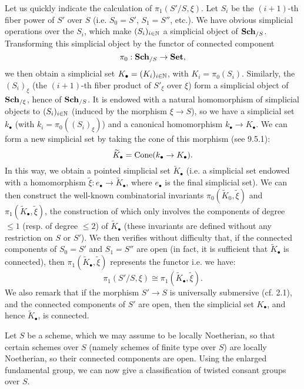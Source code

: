 Let us quickly indicate the calculation of $\pi_1(S'/S,\xi)$. Let $S_i$ be the $(i+1)$-th fiber power of $S'$ over $S$ (i.e. $S_0=S'$, $S_1=S''$, etc.). We have obvious simplicial operations over the $S_i$, which make $(S_i)_{i\in\mathbb{N}}$ a simplicial object of $\mathbf{Sch}_{/S}$. Transforming this simplicial object by the functor of connected component
\[\pi_0:\mathbf{Sch}_{/S}\to\mathbf{Set},\]
we then obtain a simplicial set $K_\bullet=(K_i)_{i\in\mathbb{N}}$, with $K_i=\pi_0(S_i)$. Similarly, the $(S_i)_\xi$ (the $(i+1)$-th fiber product of $S'_\xi$ over $\xi$) form a simplicial object of $\mathbf{Sch}_{/\xi}$, hence of $\mathbf{Sch}_{/S}$. It is endowed with a natural homomorphism of simplicial objects to $(S_i)_{i\in\mathbb{N}}$ (induced by the morphism $\xi\to S$), so we have a simplicial set $k_\bullet$ (with $k_i=\pi_0((S_i)_\xi)$) and a canonical homomorphism $k_\bullet\to K_\bullet$. We can form a new simplicial set by taking the cone of this morphism (see \cite{SGA3-2}  9.5.1):
\[\widetilde{K}_\bullet=\mathrm{Cone}(k_\bullet\to K_\bullet).\]
In this way, we obtain a pointed simplicial set $\widetilde{K}_\bullet$ (i.e. a simplicial set endowed with a homomorphism $\tilde{\xi}:e_\bullet\to\widetilde{K}_\bullet$, where $e_\bullet$ is the final simplicial set). We can then construct the well-known combinatorial invariants $\pi_0(\widetilde{K}_0,\tilde{\xi})$ and $\pi_1(\widetilde{K}_\bullet,\tilde{\xi})$, the construction of which only involves the components of degree $\leq 1$ (resp. of degree $\leq 2$) of $\widetilde{K}_\bullet$ (these invariants are defined without any restriction on $S$ or $S'$). We then verifies without difficulty that, if the connected components of $S_0=S'$ and $S_1=S''$ are open (in fact, it is sufficient that $\widetilde{K}_\bullet$ is connected), then $\pi_1(\widetilde{K}_\bullet,\tilde{\xi})$ represents the functor i.e. we have:
\[\pi_1(S'/S,\xi)\cong\pi_1(\widetilde{K}_\bullet,\tilde{\xi}).\]
We also remark that if the morphism $S'\to S$ is universally submersive (cf. \cite{SGA1}  2.1), and the connected components of $S'$ are open, then the simplicial set $K_\bullet$, and hence $\widetilde{K}_\bullet$, is connected.

\begin{example}\label{scheme enlarged fundamental group example}

\end{example}

Let $S$ be a scheme, which we may assume to be locally Noetherian, so that certain schemes over $S$ (namely schemes of finite type over $S$) are locally Noetherian, so their connected components are open. Using the enlarged fundamental group, we can now give a classification of twisted consant groups over $S$. 

